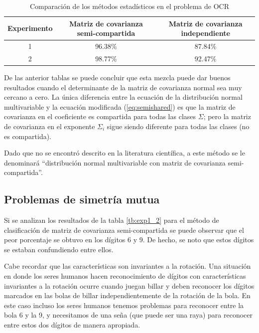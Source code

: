 \documentclass[a4paper, 11pt, oneside]{report}
\begin{document}
	\begin{table}
	\begin{center}
	\begin{tabular}{|c|c|c|}		
		\hline
		Experimento & Matriz de covarianza semi-compartida & Matriz de covarianza independiente \\
		\hline
		1 & 96.38\% & 87.84\% \\
		2 & 98.77\% & 92.47\% \\
		\hline		
	\end{tabular}
	\end{center}
	\caption{Comparación de los métodos estadísticos en el problema de OCR}	
	\label{tb:classifResult}
	\end{table}

De las anterior tablas se puede concluir que esta mezcla puede dar buenos resultados cuando el determinante de la matriz de covarianza normal sea muy cercano a cero. La única diferencia entre la ecuación de la distribución normal multivariable y la ecuación modificada (\ref{eq:semishared}) es que la matriz de covarianza en el coeficiente es compartida para todas las clases $\Sigma$; pero la matriz de covarianza en el exponente $\Sigma_i$ sigue siendo diferente para todas las clases (no es compartida).

Dado que no se encontró descrito en la literatura científica, a este método se le denominará ``distribución normal multivariable con matriz de covarianza semi-compartida''.

\subsection{Problemas de simetría mutua}
\label{sect:mutualSym}

Si se analizan los resultados de la tabla \ref{tb:exp1_2} para el método de clasificación de matriz de covarianza semi-compartida se puede observar que el peor porcentaje se obtuvo en los dígitos 6 y 9. De hecho, se noto que estos dígitos se estaban confundiendo entre ellos.
 
Cabe recordar que las características son invariantes a la rotación. Una situación en donde los seres humanos hacen reconocimiento de dígitos con características invariantes a la rotación ocurre cuando juegan billar y deben reconocer los dígitos marcados en las bolas de billar independientemente de la rotación de la bola. En este caso incluso los seres humanos tenemos problemas para reconocer entre la bola 6 y la 9, y necesitamos de una seña (que puede ser una raya) para reconocer entre estos dos dígitos de manera apropiada.
\end{document}
